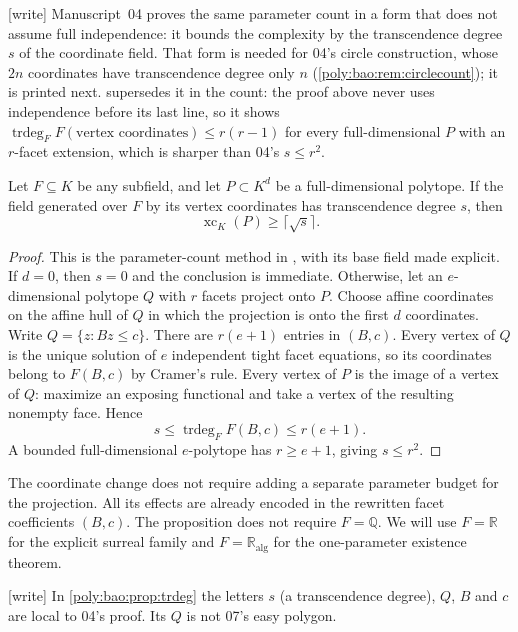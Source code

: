 \documentclass[11pt,a4paper]{article}
\numberwithin{equation}{section}
\theoremstyle{plain}
\newcommand{\wtag}{\textup{[write]}}%
\newcommand{\R}{\mathbb R}
\newcommand{\Q}{\mathbb Q}
\newcommand{\trdeg}{\operatorname{trdeg}}
\newcommand{\A}{\mathbb R_{\mathrm{alg}}}
\newcommand{\xc}{\operatorname{xc}}
\begin{document}
\wtag{} Manuscript~04 proves the same parameter count in a form that does
not assume full independence: it bounds the complexity by the
transcendence degree $s$ of the coordinate field. That form is needed for
04's circle construction, whose $2n$ coordinates have transcendence degree
only $n$ (\cref{poly:bao:rem:circlecount}); it is printed next.
 supersedes it in the count: the proof above
never uses independence before its last line, so it shows
$\trdeg_F F(\text{vertex coordinates})\leq r(r-1)$ for every
full-dimensional $P$ with an $r$-facet extension, which is sharper than
04's $s\leq r^2$.

\begin{proposition}\label{poly:bao:prop:trdeg}
Let $F\subseteq K$ be any subfield, and let $P\subset K^d$ be a
full-dimensional polytope. If the field generated over $F$ by its vertex
coordinates has transcendence degree $s$, then
\begin{equation}\label{poly:bao:eq:trdeg}
 \xc_K(P)\geq\lceil\sqrt{s}\rceil.
\end{equation}
\end{proposition}
\begin{proof}
This is the parameter-count method in \cite{ic:frt}, with its base field made
explicit. If $d=0$, then $s=0$ and the conclusion is immediate. Otherwise,
let an $e$-dimensional polytope $Q$ with $r$ facets project onto
$P$. Choose affine coordinates on the affine hull of $Q$ in which the
projection is onto the first $d$ coordinates. Write $Q=\{z:Bz\leq c\}$.
There are $r(e+1)$ entries in $(B,c)$. Every vertex of $Q$ is the unique
solution of $e$ independent tight facet equations, so its coordinates
belong to $F(B,c)$ by Cramer's rule. Every vertex of $P$ is the image of a
vertex of $Q$: maximize an exposing functional and take a vertex of the
resulting nonempty face. Hence
\[
 s\leq\trdeg_F F(B,c)\leq r(e+1).
\]
A bounded full-dimensional $e$-polytope has $r\geq e+1$, giving $s\leq r^2$.
\end{proof}

The coordinate change does not require adding a separate parameter budget
for the projection. All its effects are already encoded in the rewritten
facet coefficients $(B,c)$. The proposition does not require $F=\Q$.
We will use $F=\R$ for the explicit surreal family and $F=\A$ for the
one-parameter existence theorem.

\wtag{} In \cref{poly:bao:prop:trdeg} the letters $s$ (a transcendence
degree), $Q$, $B$ and $c$ are local to 04's proof. Its $Q$ is not 07's
easy polygon.
\end{document}
